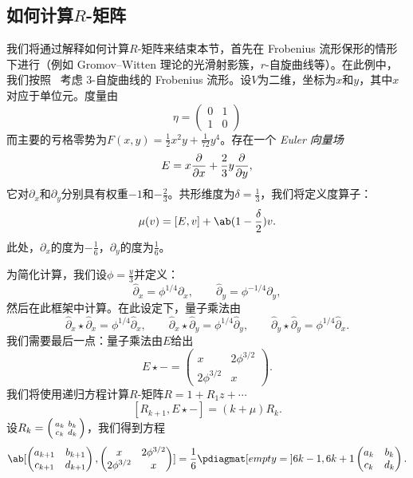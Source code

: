 \documentclass{amsart}
\theoremstyle{definition}
\theoremstyle{remark}
\theoremstyle{plain}
\theoremstyle{definition}
\theoremstyle{remark}
\newcommand{\1}{\mathbf{1}}
\newcommand{\2}{\mathbf{2}}
\newcommand{\3}{\mathbf{3}}
\begin{document}
\subsection{如何计算\(R\)-矩阵}%
\label{sub:How to compute the R-matrix}

我们将通过解释如何计算\(R\)-矩阵来结束本节，首先在 Frobenius 流形保形的情形下进行（例如 Gromov--Witten 理论的光滑射影簇，\(r\)-自旋曲线等）。在此例中，我们按照~\cite{PPZ2015} 考虑 3-自旋曲线的 Frobenius 流形。设\(V\)为二维，坐标为\(x\)和\(y\)，其中\(x\)对应于单位元。度量由
\[ \eta = \begin{pmatrix}
    0 & 1 \\
    1 & 0
\end{pmatrix} \]
而主要的亏格零势为\(F(x,y) = \frac{1}{2} x^2 y + \frac{1}{72} y^4\)。存在一个 \textit{Euler 向量场}
\[ E = x \pdv{}{x} + \frac{2}{3} y \pdv{}{y}, \]
它对\(\partial_x\)和\(\partial_y\)分别具有权重\(-1\)和\(-\frac{2}{3}\)。共形维度为\(\delta = \frac{1}{3}\)，我们将定义度算子：
\[ \mu(v) = [E,v] + \ab(1 - \frac{\delta}{2})v. \]
此处，\(\partial_x\)的度为\(-\frac{1}{6}\)，\(\partial_y\)的度为\(\frac{1}{6}\)。

为简化计算，我们设\(\phi = \frac{y}{3}\)并定义：
\[ \hat{\partial}_x = \phi^{1/4} \partial_x, \qquad \hat{\partial}_y = \phi^{-1/4} \partial_y, \]
然后在此框架中计算。在此设定下，量子乘法由
\[ \hat{\partial}_x \star \hat{\partial}_x = \phi^{1/4} \hat{\partial}_x, \qquad \hat{\partial}_x \star \hat{\partial}_y = \phi^{1/4} \hat{\partial}_y, \qquad \hat{\partial}_y \star \hat{\partial}_y = \phi^{1/4} \hat{\partial}_x. \]
我们需要最后一点：量子乘法由\(E\)给出
\[ E \star - = \begin{pmatrix}
    x & 2 \phi^{3/2} \\
    2 \phi^{3/2} & x 
\end{pmatrix}. \]
我们将使用递归方程计算\(R\)-矩阵\(R = 1 + R_1 z + \cdots\)
\[ [R_{k+1}, E \star -] = (k + \mu) R_k. \]
设\(R_k = \begin{psmallmatrix}
    a_k & b_k \\
    c_k & d_k
\end{psmallmatrix}\)，我们得到方程
\[ \ab[
    \begin{pmatrix}
        a_{k+1} & b_{k+1} \\
        c_{k+1} & d_{k+1}
    \end{pmatrix}, \begin{pmatrix}
        x & 2 \phi^{3/2} \\
        2 \phi^{3/2} & x 
    \end{pmatrix}
] = \frac{1}{6} \pdiagmat[empty={}]{6k-1, 6k+1} \begin{pmatrix}
    a_k & b_k \\
    c_k & d_k 
\end{pmatrix}. \]
\end{document}
